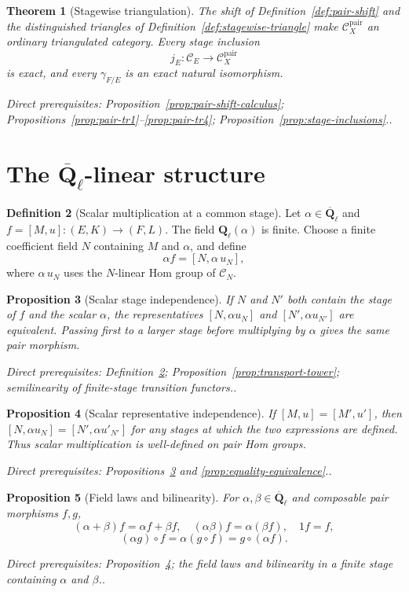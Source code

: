 \documentclass[10pt]{article}
\newtheorem{theorem}{Theorem}[section]
\newtheorem{proposition}[theorem]{Proposition}
\theoremstyle{definition}
\newtheorem{definition}[theorem]{Definition}
\newcommand{\Ql}{\mathbf Q_\ell}
\newcommand{\Qlb}{\overline{\mathbf Q}_\ell}
\newcommand{\Pair}{\mathcal C_X^{\mathrm{pair}}}
\newcommand{\depends}[1]{\par\smallskip\noindent\textit{Direct prerequisites:} #1.}
\begin{document}
\begin{theorem}[Stagewise triangulation]\label{thm:pair-triangulated}
The shift of Definition~\ref{def:pair-shift} and the distinguished triangles
of Definition~\ref{def:stagewise-triangle} make $\Pair$ an ordinary
triangulated category.  Every stage inclusion
\[
 j_E:\mathcal C_E\longrightarrow\Pair
\]
is exact, and every $\gamma_{F/E}$ is an exact natural isomorphism.
\depends{Proposition~\ref{prop:pair-shift-calculus};
Propositions~\ref{prop:pair-tr1}--\ref{prop:pair-tr4};
Proposition~\ref{prop:stage-inclusions}.}
\end{theorem}

\section{The \texorpdfstring{$\Qlb$}{Qbar-l}-linear structure}

\begin{definition}[Scalar multiplication at a common stage]
\label{def:qbar-scalar}
Let $\alpha\in\Qlb$ and $f=[M,u]:(E,K)\to(F,L)$.  The field
$\Ql(\alpha)$ is finite.  Choose a finite coefficient field $N$ containing $M$ and
$\alpha$, and define
\[
 \alpha f=[N,\alpha\,u_N],
\]
where $\alpha\,u_N$ uses the $N$-linear Hom group of $\mathcal C_N$.
\end{definition}

\begin{proposition}[Scalar stage independence]
\label{prop:scalar-stage}
If $N$ and $N'$ both contain the stage of $f$ and the scalar $\alpha$, the
representatives $[N,\alpha u_N]$ and $[N',\alpha u_{N'}]$ are equivalent.
Passing first to a larger stage before multiplying by $\alpha$ gives the
same pair morphism.
\depends{Definition~\ref{def:qbar-scalar}; Proposition~\ref{prop:transport-tower};
semilinearity of finite-stage transition functors.}
\end{proposition}

\begin{proposition}[Scalar representative independence]
\label{prop:scalar-representative}
If $[M,u]=[M',u']$, then
$[N,\alpha u_N]=[N',\alpha u'_{N'}]$ for any stages at which the two
expressions are defined.  Thus scalar multiplication is well-defined on
pair Hom groups.
\depends{Propositions~\ref{prop:scalar-stage} and
\ref{prop:equality-equivalence}.}
\end{proposition}

\begin{proposition}[Field laws and bilinearity]\label{prop:scalar-laws}
For $\alpha,\beta\in\Qlb$ and composable pair morphisms $f,g$,
\[
 (\alpha+\beta)f=\alpha f+\beta f,
 \quad (\alpha\beta)f=\alpha(\beta f),
 \quad 1f=f,
\]
\[
 (\alpha g)\circ f=\alpha(g\circ f)
   =g\circ(\alpha f).
\]
\depends{Proposition~\ref{prop:scalar-representative}; the field laws and
bilinearity in a finite stage containing $\alpha$ and $\beta$.}
\end{proposition}
\end{document}
